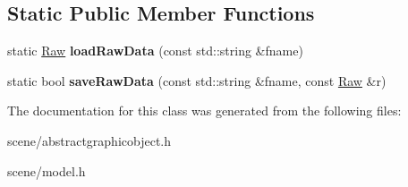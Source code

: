 \subsection*{Static Public Member Functions}
\begin{DoxyCompactItemize}
\item 
\hypertarget{class_tempest_1_1_model_a5ce67e48f77f722ea7ca8d6ed4c0af4e}{static \hyperlink{struct_tempest_1_1_raw_model}{Raw} {\bfseries load\+Raw\+Data} (const std\+::string \&fname)}\label{class_tempest_1_1_model_a5ce67e48f77f722ea7ca8d6ed4c0af4e}

\item 
\hypertarget{class_tempest_1_1_model_a959c4a4665a6c2d3ad21e858a87717bc}{static bool {\bfseries save\+Raw\+Data} (const std\+::string \&fname, const \hyperlink{struct_tempest_1_1_raw_model}{Raw} \&r)}\label{class_tempest_1_1_model_a959c4a4665a6c2d3ad21e858a87717bc}

\end{DoxyCompactItemize}


The documentation for this class was generated from the following files\+:\begin{DoxyCompactItemize}
\item 
scene/abstractgraphicobject.\+h\item 
scene/model.\+h\end{DoxyCompactItemize}
